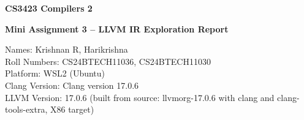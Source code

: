 \documentclass[11pt,a4paper]{article}
\begin{document}
\begin{center}
{\Large\bfseries CS3423 Compilers 2\par}
\vspace{4pt}
{\large\bfseries Mini Assignment 3 -- LLVM IR Exploration Report\par}
\end{center}

\noindent Names: Krishnan R, Harikrishna\\
Roll Numbers: CS24BTECH11036, CS24BTECH11030\\
Platform: WSL2 (Ubuntu)\\
Clang Version: Clang version 17.0.6\\
LLVM Version: 17.0.6 (built from source: llvmorg-17.0.6 with clang and clang-tools-extra, X86 target)

\tableofcontents


\end{document}
